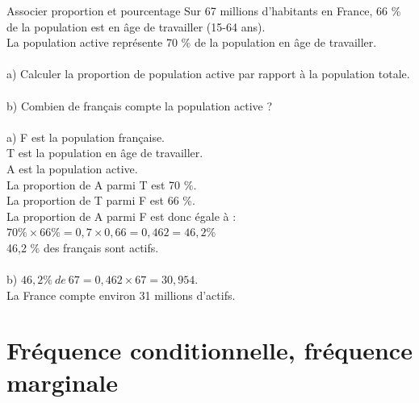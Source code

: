 \begin{methodeTitre}{Associer proportion et pourcentage}
	Sur 67 millions d'habitants en France, 66 \% de la population est en âge de travailler (15-64 ans).\\
	La population active représente 70 \% de la population en âge de travailler.\\
	\\
	a) Calculer la proportion de population active par rapport à la population totale.\\
	\\
	b) Combien de français compte la population active ?\\
	\\
	
	a) F est la population française.\\    
	T est la population en âge de travailler.\\
	A est la population active.\\
	La proportion de A parmi T est 70 \%.\\
	La proportion de T parmi F est 66 \%.\\
	La proportion de A parmi F est donc égale à :\\
	$70 \% \times 66 \% = 0,7 \times 0,66 = 0,462 = 46,2 \%$\\
	46,2 \% des français sont actifs.\\
	\\
	b) $46,2 \%\ de\ 67 = 0,462 \times 67 = 30,954$.\\
	La France compte environ 31 millions d'actifs.
\end{methodeTitre}

\section{Fréquence conditionnelle, fréquence marginale}

